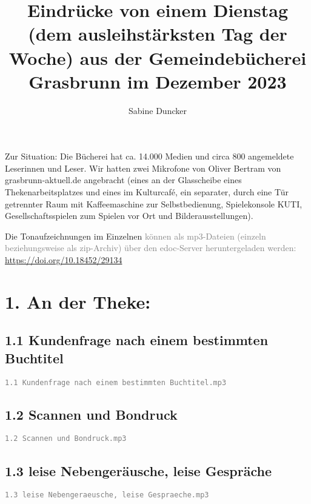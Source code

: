 \documentclass[a4paper,
fontsize=11pt,
oneside,
numbers=noperiodatend,
parskip=half-,
bibliography=totoc,
final
]{scrartcl}
\title{\LARGE{Eindrücke von einem Dienstag (dem ausleihstärksten Tag der Woche) aus der Gemeindebücherei Grasbrunn im Dezember 2023}}%
\author{Sabine Duncker} %
\date{}
\begin{document}
\maketitle
\thispagestyle{fancyplain} 


Zur Situation: Die Bücherei hat ca. 14.000 Medien und circa 800
angemeldete Leserinnen und Leser. Wir hatten zwei Mikrofone von Oliver
Bertram von grasbrunn-aktuell.de angebracht (eines an der Glasscheibe
eines Thekenarbeitsplatzes und eines im Kulturcafé, ein separater, durch
eine Tür getrennter Raum mit Kaffeemaschine zur Selbstbedienung,
Spielekonsole KUTI, Gesellschaftsspielen zum Spielen vor Ort und
Bilderausstellungen).

Die Tonaufzeichnungen im Einzelnen \textcolor{gray}{können als mp3-Dateien (einzeln beziehungsweise als zip-Archiv) über den edoc-Server heruntergeladen werden: \href{https://doi.org/10.18452/29134}{\color{gray}https://doi.org/10.18452/29134}}

\hypertarget{an-der-theke}{%
\section{1. An der Theke:}\label{an-der-theke}}


\hypertarget{kundenfrage-nach-einem-bestimmten-buchtitel}{%
\subsection{1.1 Kundenfrage nach einem bestimmten
Buchtitel}\label{kundenfrage-nach-einem-bestimmten-buchtitel}}

\textcolor{gray}{\texttt{1.1 Kundenfrage nach einem bestimmten Buchtitel.mp3}}


\hypertarget{scannen-und-bondruck}{%
\subsection{1.2 Scannen und Bondruck}\label{scannen-und-bondruck}}

\textcolor{gray}{\texttt{1.2 Scannen und Bondruck.mp3}}


\hypertarget{leise-nebengeruxe4usche-leise-gespruxe4che}{%
\subsection{1.3 leise Nebengeräusche, leise
Gespräche}\label{leise-nebengeruxe4usche-leise-gespruxe4che}}

\textcolor{gray}{\texttt{1.3 leise Nebengeraeusche, leise Gespraeche.mp3}}
\end{document}
